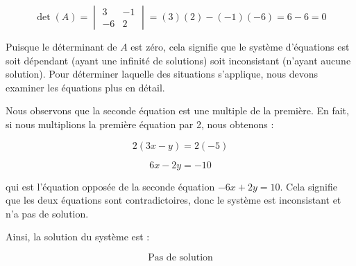 \documentclass[12pt]{article}
\begin{document}
\[
\det(A) = \begin{vmatrix}
3 & -1 \\
-6 & 2
\end{vmatrix} = (3)(2) - (-1)(-6) = 6 - 6 = 0
\]

Puisque le déterminant de $A$ est zéro, cela signifie que le système d'équations est soit dépendant (ayant une infinité de solutions) soit inconsistant (n'ayant aucune solution). Pour déterminer laquelle des situations s'applique, nous devons examiner les équations plus en détail.

Nous observons que la seconde équation est une multiple de la première. En fait, si nous multiplions la première équation par 2, nous obtenons :

\[
2(3x - y) = 2(-5)
\]

\[
6x - 2y = -10
\]

qui est l'équation opposée de la seconde équation \(-6x + 2y = 10\). Cela signifie que les deux équations sont contradictoires, donc le système est inconsistant et n'a pas de solution.

Ainsi, la solution du système est :

\[
\boxed{\text{Pas de solution}}
\]
\end{document}
